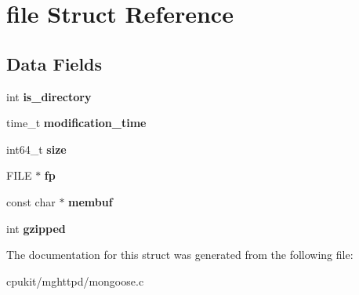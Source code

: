 \hypertarget{structfile}{}\section{file Struct Reference}
\label{structfile}
\subsection*{Data Fields}
\begin{DoxyCompactItemize}
\item 
\mbox{\label{structfile_ab59db1e2d2cc73cf7d8bca11d91c362c}} 
int {\bfseries is\+\_\+directory}
\item 
\mbox{\label{structfile_ad81da78c444fb2b390139bb0ddd669c8}} 
time\+\_\+t {\bfseries modification\+\_\+time}
\item 
\mbox{\label{structfile_a3b71d72c8ce755ec1bc869ce2a365d3b}} 
int64\+\_\+t {\bfseries size}
\item 
\mbox{\label{structfile_a1e49ab70b3c155b75c02cec07a067130}} 
F\+I\+LE $\ast$ {\bfseries fp}
\item 
\mbox{\label{structfile_ad85e51e749edb2fd3177c8b9b0c4fed3}} 
const char $\ast$ {\bfseries membuf}
\item 
\mbox{\label{structfile_a41fe6ec740044db8fc53af961af72034}} 
int {\bfseries gzipped}
\end{DoxyCompactItemize}


The documentation for this struct was generated from the following file\+:\begin{DoxyCompactItemize}
\item 
cpukit/mghttpd/mongoose.\+c\end{DoxyCompactItemize}
